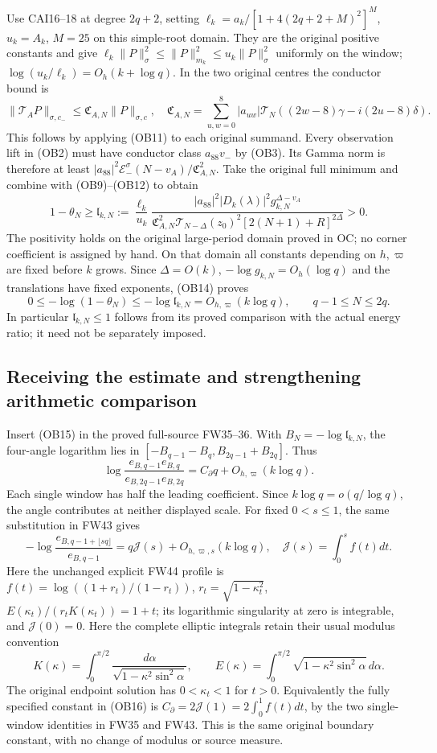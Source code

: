 \documentclass[11pt]{article}
\theoremstyle{remark}\newtheorem{remark}[theorem]{Remark}
\begin{document}
Use CAI16--18 at degree $2q+2$, setting
$\ell_k=a_k/[1+4(2q+2+M)^2]^M$, $u_k=A_k$, $M=25$ on this
simple-root domain. They are the original positive constants and give
$\ell_k\|P\|_\sigma^2\le\|P\|_{m_k}^2\le u_k\|P\|_\sigma^2$
uniformly on the window; $\log(u_k/\ell_k)=O_h(k+\log q)$.
In the two original centres the conductor bound is
\[
 \|\mathcal T_AP\|_{\sigma,c_-}\le\mathfrak C_{A,N}\|P\|_{\sigma,c},
 \quad\mathfrak C_{A,N}=\sum_{u,w=0}^8|a_{uw}|
 \mathcal T_N((2w-8)\gamma-i(2u-8)\delta).\tag{OB13}
\]
This follows by applying (OB11) to each original summand. Every
observation lift in (OB2) must have conductor class $a_{88}v_-$
by (OB3). Its Gamma norm is therefore at least
$|a_{88}|^2\mathcal E_-^\sigma(N-v_A)/\mathfrak C_{A,N}^2$.
Take the original full minimum and combine with (OB9)--(OB12) to obtain
\[
 1-\theta_N\ge\mathfrak l_{k,N}:=
 \frac{\ell_k}{u_k}
 \frac{|a_{88}|^2|D_k(\lambda)|^2g_{k,N}^{\Delta-v_A}}
 {\mathfrak C_{A,N}^2\mathcal T_{N-\Delta}(z_0)^2
 [2(N+1)+R]^{2\Delta}}>0.\tag{OB14}
\]
The positivity holds on the original large-period domain proved in OC;
no corner coefficient is assigned by hand. On that domain all constants
depending on $h,\varpi$ are fixed before $k$ grows. Since
$\Delta=O(k)$, $-\log g_{k,N}=O_h(\log q)$ and the translations
have fixed exponents, (OB14) proves
\[
 0\le-\log(1-\theta_N)\le-\log\mathfrak l_{k,N}
 =O_{h,\varpi}(k\log q),\qquad q-1\le N\le2q.\tag{OB15}
\]
In particular $\mathfrak l_{k,N}\le1$ follows from its proved comparison
with the actual energy ratio; it need not be separately imposed.

\subsection{Receiving the estimate and strengthening arithmetic comparison}
Insert (OB15) in the proved full-source FW35--36. With
$B_N=-\log\mathfrak l_{k,N}$, the four-angle logarithm lies in
$[-B_{q-1}-B_q,B_{2q-1}+B_{2q}]$. Thus
\[
 \log\frac{e_{B,q-1}e_{B,q}}{e_{B,2q-1}e_{B,2q}}
 =C_\partial q+O_{h,\varpi}(k\log q).\tag{OB16}
\]
Each single window has half the leading coefficient. Since
$k\log q=o(q/\log q)$, the angle contributes at neither displayed
scale. For fixed $0<s\le1$, the same substitution in FW43 gives
\[
 -\log\frac{e_{B,q-1+\lfloor sq\rfloor}}{e_{B,q-1}}
 =q\mathcal J(s)+O_{h,\varpi,s}(k\log q),\quad
 \mathcal J(s)=\int_0^sf(t)dt.\tag{OB17}
\]
Here the unchanged explicit FW44 profile is
$f(t)=\log((1+r_t)/(1-r_t))$,
$r_t=\sqrt{1-\kappa_t^2}$,
$E(\kappa_t)/(r_tK(\kappa_t))=1+t$; its logarithmic singularity
at zero is integrable, and $\mathcal J(0)=0$.
Here the complete elliptic integrals retain their usual modulus
convention
\[
 K(\kappa)=\int_0^{\pi/2}\frac{d\alpha}{\sqrt{1-\kappa^2\sin^2\alpha}},
 \qquad E(\kappa)=\int_0^{\pi/2}\sqrt{1-\kappa^2\sin^2\alpha}\,d\alpha.
\]
The original endpoint solution has $0<\kappa_t<1$ for $t>0$.
Equivalently the fully specified constant in (OB16) is
$C_\partial=2\mathcal J(1)=2\int_0^1f(t)dt$, by the two
single-window identities in FW35 and FW43. This is the same original
boundary constant, with no change of modulus or source measure.
\end{document}
